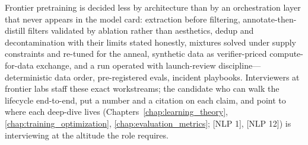 \begin{keyinsight}
Frontier pretraining is decided less by architecture than by an orchestration layer that never appears in the model card: extraction before filtering, annotate-then-distill filters validated by ablation rather than aesthetics, dedup and decontamination with their limits stated honestly, mixtures solved under supply constraints and re-tuned for the anneal, synthetic data as verifier-priced compute-for-data exchange, and a run operated with launch-review discipline---deterministic data order, pre-registered evals, incident playbooks. Interviewers at frontier labs staff these exact workstreams; the candidate who can walk the lifecycle end-to-end, put a number and a citation on each claim, and point to where each deep-dive lives (Chapters~\ref{chap:learning_theory}, \ref{chap:training_optimization}, \ref{chap:evaluation_metrics}; [NLP 1], [NLP 12]) is interviewing at the altitude the role requires.
\end{keyinsight}

